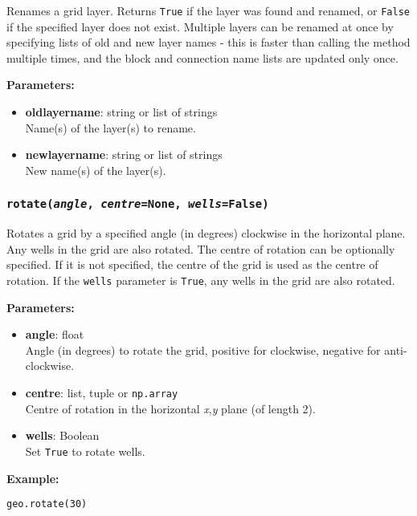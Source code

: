 Renames a grid layer.  Returns \texttt{True} if the layer was found and renamed, or \texttt{False} if the specified layer does not exist.  Multiple layers can be renamed at once by specifying lists of old and new layer names - this is faster than calling the method multiple times, and the block and connection name lists are updated only once.

\textbf{Parameters:}
\begin{itemize}
  \item \textbf{oldlayername}: string or list of strings\\
    Name(s) of the layer(s) to rename.
  \item \textbf{newlayername}: string or list of strings\\
    New name(s) of the layer(s).
\end{itemize}

\begin{snugshade}
\subsubsection{\texttt{rotate(\emph{angle}, \emph{centre}=\texttt{None}, \emph{wells}=\texttt{False})}}\end{snugshade}
\label{sec:mulgrid:rotate}

Rotates a grid by a specified angle (in degrees) clockwise in the horizontal plane.  Any wells in the grid are also rotated.  The centre of rotation can be optionally specified.  If it is not specified, the centre of the grid is used as the centre of rotation.  If the \texttt{wells} parameter is \texttt{True}, any wells in the grid are also rotated.

\textbf{Parameters:}
\begin{itemize}
  \item \textbf{angle}: float\\
    Angle (in degrees) to rotate the grid, positive for clockwise, negative for anti-clockwise.
  \item \textbf{centre}: list, tuple or \texttt{np.array}\\
    Centre of rotation in the horizontal \emph{x},\emph{y} plane (of length 2).
  \item \textbf{wells}: Boolean\\
    Set \texttt{True} to rotate wells.
\end{itemize}

\textbf{Example:}

\begin{lstlisting}
geo.rotate(30)
\end{lstlisting}


